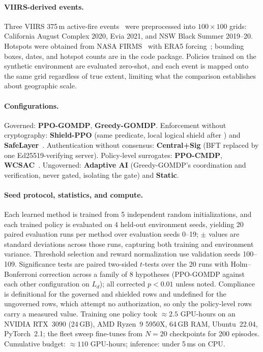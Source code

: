 \documentclass[letterpaper]{article} %
\begin{document}
\paragraph{VIIRS-derived events.} Three VIIRS 375\,m active-fire events~\citep{schroeder2014} were preprocessed into $100\times100$ grids: California August Complex 2020, Evia 2021, and NSW Black Summer 2019--20. Hotspots were obtained from NASA FIRMS~\citep{firms2024} with ERA5 forcing~\citep{hersbach2020}; bounding boxes, dates, and hotspot counts are in the code package. Policies trained on the synthetic environment are evaluated zero-shot, and each event is mapped onto the same grid regardless of true extent, limiting what the comparison establishes about geographic scale.

\paragraph{Configurations.} Governed: \textbf{PPO-GOMDP}, \textbf{Greedy-GOMDP}. Enforcement without cryptography: \textbf{Shield-PPO} (same predicate, local logical shield after \citealp{alshiekh2018}) and \textbf{SafeLayer}~\citep{dalal2018}. Authentication without consensus: \textbf{Central+Sig} (BFT replaced by one Ed25519-verifying server). Policy-level surrogates: \textbf{PPO-CMDP}, \textbf{WCSAC}~\citep{yang2021wcsac}. Ungoverned: \textbf{Adaptive AI} (Greedy-GOMDP's coordination and verification, never gated, isolating the gate) and \textbf{Static}.

\paragraph{Seed protocol, statistics, and compute.} Each learned method is trained from 5 independent random initializations, and each trained policy is evaluated on 4 held-out environment seeds, yielding 20 paired evaluation runs per method over evaluation seeds 0--19; $\pm$ values are standard deviations across those runs, capturing both training and environment variance. Threshold selection and reward normalization use validation seeds 100--109. Significance tests are paired two-sided $t$-tests over the 20 runs with Holm--Bonferroni correction across a family of 8 hypotheses (PPO-GOMDP against each other configuration on $L_d$); all corrected $p<0.01$ unless noted. Compliance is definitional for the governed and shielded rows and undefined for the ungoverned rows, which attempt no authorization, so only the policy-level rows carry a measured value. Training one policy took $\approx 2.5$ GPU-hours on an NVIDIA RTX~3090 (24\,GB), AMD Ryzen~9 5950X, 64\,GB RAM, Ubuntu~22.04, PyTorch~2.1; the fleet sweep fine-tunes from $N{=}20$ checkpoints for 200 episodes. Cumulative budget: $\approx 110$ GPU-hours; inference: under 5\,ms on CPU.
\end{document}

